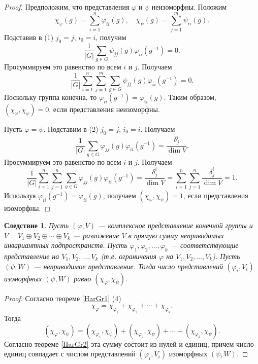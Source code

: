 \documentclass[12pt, titlepage, oneside]{amsbook}
\newtheorem{corollary}[theorem]{Следствие}
\theoremstyle{definition}
\theoremstyle{remark}
\begin{document}
\begin{proof}
	Предположим, что представления $\varphi$ и $\psi$ неизоморфны. Положим $$\chi_{\varphi}(g)=\sum\limits_{i=1}^n\varphi_{ii}(g),\quad\chi_{\psi}(g)=\sum\limits_{j=1}^m\psi_{ii}(g).$$ Подставив в (1) $j_0=j$, $i_0=i$, получим $$\frac{1}{|G|}\sum\limits_{g\in G}\psi_{jj}(g)\varphi_{ii}(g^{-1})=0.$$ Просуммируем это равенство по всем $i$ и $j$. Получаем $$\frac{1}{|G|}\sum\limits_{i=1}^n\sum\limits_{j=1}^m\sum\limits_{g\in G}\psi_{jj}(g)\varphi_{ii}(g^{-1})=0.$$ Поскольку группа конечна, то $\varphi_{ii}(g^{-1})=\overline{\varphi_{ii}(g)}$. Таким образом, $(\chi_{\varphi},\chi_{\psi})=0$, если представления неизоморфны.
	
	Пусть $\varphi=\psi$. Подставим в (2) $j_0=j$, $i_0=i$. Получаем $$\frac{1}{|G|}\sum\limits_{g\in G}\varphi_{jj}(g)\varphi_{ii}(g^{-1})=\frac{\delta_{j}^{i}}{\dim V}.$$ Просуммируем это равенство по всем $i$ и $j$. Получаем $$\frac{1}{|G|}\sum\limits_{i=1}^n\sum\limits_{j=1}^n\sum\limits_{g\in G}\varphi_{jj}(g)\varphi_{ii}(g^{-1})=\frac{\delta_{j}^{i}}{\dim V}=\sum\limits_{i=1}^n\sum\limits_{j=1}^n\frac{\delta_{j}^{i}}{\dim V}=1.$$ Используя $\varphi_{ii}(g^{-1})=\overline{\varphi_{ii}(g)}$, получаем $(\chi_{\varphi},\chi_{\psi})=1$, если представления изоморфны.
\end{proof}

\begin{corollary}
	\label{HarGr3}
	Пусть $(\varphi,V)$ --- комплексное представление конечной группы и $V=V_1\oplus V_2\oplus\cdots\oplus V_k$ --- разложение $V$ в прямую сумму неприводимых инвариантных подпространств. Пусть $\varphi_1,\varphi_2,\ldots,\varphi_k$ --- соответствующие представление на $V_1,V_2,\ldots,V_k$ (т.е. ограничения $\varphi$ на $V_1,V_2,\ldots,V_k$). Пусть $(\psi,W)$ --- неприводимое представление. Тогда число представлений $(\varphi_i,V_i)$ изоморфных $(\psi,W)$ равно $(\chi_{\varphi},\chi_{\psi})$.
\end{corollary}

\begin{proof}
	Согласно теореме \ref{HarGr1} (4) $$\chi_{\varphi}=\chi_{\varphi_1}+\chi_{\varphi_2}+\cdots+\chi_{\varphi_k}.$$ Тогда $$(\chi_{\varphi},\chi_{\psi})=(\chi_{\varphi_1},\chi_{\psi})+(\chi_{\varphi_2},\chi_{\psi})+\cdots+(\chi_{\varphi_k},\chi_{\psi}).$$ Согласно теореме \ref{HarGr2} эта сумму состоит из нулей и единиц, причем число единиц совпадает с числом представлений $(\varphi_i,V_i)$ изоморфных $(\psi,W)$.
\end{proof}
\end{document}

